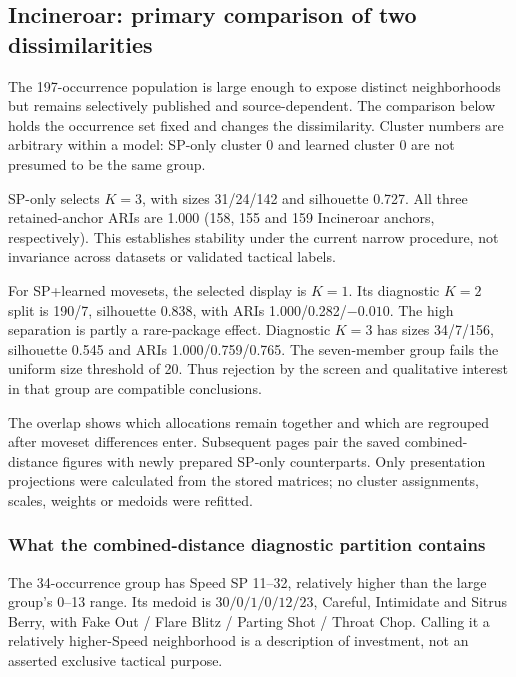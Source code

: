 \documentclass[10pt,a4paper]{article}
\begin{document}
\subsection{Incineroar: primary comparison of two dissimilarities}
The 197-occurrence population is large enough to expose distinct neighborhoods but remains selectively published and source-dependent. The comparison below holds the occurrence set fixed and changes the dissimilarity. Cluster numbers are arbitrary within a model: SP-only cluster 0 and learned cluster 0 are not presumed to be the same group.

\begin{table}[!ht]\centering\small
\caption{Selected and diagnostic partitions from saved results. ARIs list all three limited group-subsample comparisons. A dash means silhouette is undefined at $K=1$, not zero.}
\resizebox{\linewidth}{!}{\CandidateTable}
\end{table}
SP-only selects $K=3$, with sizes 31/24/142 and silhouette 0.727. All three retained-anchor ARIs are 1.000 (158, 155 and 159 Incineroar anchors, respectively). This establishes stability under the current narrow procedure, not invariance across datasets or validated tactical labels.

For SP+learned movesets, the selected display is $K=1$. Its diagnostic $K=2$ split is 190/7, silhouette 0.838, with ARIs 1.000/0.282/$-0.010$. The high separation is partly a rare-package effect. Diagnostic $K=3$ has sizes 34/7/156, silhouette 0.545 and ARIs 1.000/0.759/0.765. The seven-member group fails the uniform size threshold of 20. Thus rejection by the screen and qualitative interest in that group are compatible conclusions.

\begin{table}[!ht]\centering\small
\caption{Occurrence overlap between the two saved Incineroar $K=3$ partitions. Rows use SP-only cluster indices; columns use learned-combined indices. This is a membership comparison, not a tactical confusion matrix.}
\CrossTable
\end{table}
The overlap shows which allocations remain together and which are regrouped after moveset differences enter. Subsequent pages pair the saved combined-distance figures with newly prepared SP-only counterparts. Only presentation projections were calculated from the stored matrices; no cluster assignments, scales, weights or medoids were refitted.
\clearpage

\subsubsection{What the combined-distance diagnostic partition contains}
The 34-occurrence group has Speed SP 11--32, relatively higher than the large group's 0--13 range. Its medoid is $30/0/1/0/12/23$, Careful, Intimidate and Sitrus Berry, with Fake Out / Flare Blitz / Parting Shot / Throat Chop. Calling it a relatively higher-Speed neighborhood is a description of investment, not an asserted exclusive tactical purpose.
\end{document}
